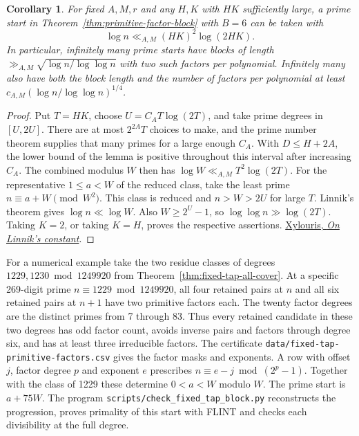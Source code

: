 \documentclass[11pt]{article}
\newtheorem{corollary}[theorem]{Corollary}
\begin{document}
\begin{corollary}\label{cor:primitive-factor-length}
For fixed \(A,M,r\) and any \(H,K\) with \(HK\) sufficiently large,
a prime start in Theorem~\ref{thm:primitive-factor-block} with \(B=6\)
can be taken with
\[
 \log n\ll_{A,M}(HK)^2\log(2HK).
\]
In particular, infinitely many prime starts have blocks of length
\(\gg_{A,M}\sqrt{\log n/\log\log n}\) with two such factors per
polynomial. Infinitely many also have both the block length and the
number of factors per polynomial at least
\(c_{A,M}(\log n/\log\log n)^{1/4}\).
\end{corollary}
\begin{proof}
Put \(T=HK\), choose \(U=C_A T\log(2T)\), and take prime degrees
in \([U,2U]\). There are at most \(2^{2A}T\) choices to make, and
the prime number theorem supplies that many primes for a large enough
\(C_A\). With \(D\le H+2A\), the lower bound of the lemma is positive
throughout this interval after increasing \(C_A\).
The combined modulus \(W\) then has \(\log W\ll_{A,M} T^2\log(2T)\).
For the representative \(1\le a<W\) of the reduced class, take the
least prime \(n\equiv a+W\pmod{W^2}\). This class is reduced and
\(n>W>2U\) for large \(T\). Linnik's theorem gives \(\log n\ll\log W\).
Also \(W\ge2^U-1\), so \(\log\log n\gg\log(2T)\).
Taking \(K=2\), or taking \(K=H\), proves the respective assertions.
\href{https://arxiv.org/abs/0906.2749}{Xylouris, \emph{On Linnik's constant}}.
\end{proof}

For a numerical example take the two residue classes of degrees
\(1229,1230\bmod1249920\) from Theorem~\ref{thm:fixed-tap-all-cover}.
At a specific 269-digit prime \(n\equiv1229\bmod1249920\), all four
retained pairs at \(n\) and all six retained pairs at \(n+1\) have two
primitive factors each. The twenty factor degrees are the distinct
primes from 7 through 83. Thus every retained candidate in these two
degrees has odd factor count, avoids inverse pairs and factors through
degree six, and has at least three irreducible factors. The certificate
\nolinkurl{data/fixed-tap-primitive-factors.csv} gives the factor masks
and exponents. A row with offset \(j\), factor degree \(p\) and exponent
\(e\) prescribes \(n\equiv e-j\bmod(2^p-1)\). Together with the class
of 1229 these determine \(0<a<W\) modulo \(W\). The prime start is
\(a+75W\). The program \nolinkurl{scripts/check_fixed_tap_block.py}
reconstructs the progression, proves primality of this start with
FLINT and checks each divisibility at the full degree.
\end{document}
